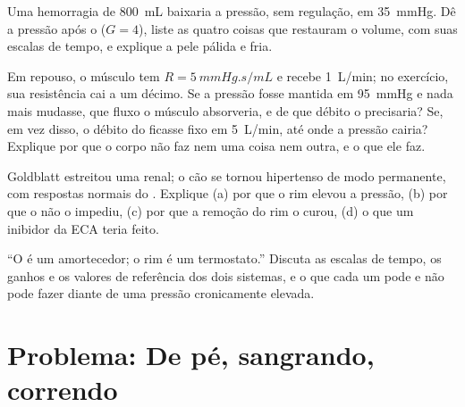 \begin{exercise}[$\star\star$]\label{exo:b2:blood-pressure:9}
Uma hemorragia de \qty{800}{mL} baixaria a pressão, sem regulação, em
\qty{35}{mmHg}. Dê a pressão após o  ($G = 4$), liste as
quatro coisas que restauram o volume, com suas escalas de tempo, e
explique a pele pálida e fria.
\end{exercise}

\begin{exercise}[$\star\star\star$]\label{exo:b2:blood-pressure:10}
Em repouso, o músculo tem $R = \qty{5}{mmHg.s/mL}$ e recebe
\qty{1}{L/min}; no exercício, sua resistência cai a um décimo. Se a
pressão fosse mantida em \qty{95}{mmHg} e nada mais mudasse, que fluxo
o músculo absorveria, e de que débito o  precisaria? Se, em vez
disso, o débito do  ficasse fixo em \qty{5}{L/min}, até onde a
pressão cairia? Explique por que o corpo não faz nem uma coisa nem
outra, e o que ele faz.
\end{exercise}

\begin{exercise}[$\star\star\star$]\label{exo:b2:blood-pressure:11}
Goldblatt estreitou uma  renal; o cão se tornou hipertenso de
modo permanente, com respostas normais do . Explique (a)
por que o rim elevou a pressão, (b) por que o  não o
impediu, (c) por que a remoção do rim o curou, (d) o que um inibidor
da ECA teria feito.
\end{exercise}

\begin{exercise}[$\star\star\star$]\label{exo:b2:blood-pressure:12}
``O  é um amortecedor; o rim é um termostato.'' Discuta as
escalas de tempo, os ganhos e os valores de referência dos dois
sistemas, e o que cada um pode e não pode fazer diante de uma pressão
cronicamente elevada.
\end{exercise}

\section{Problema: De pé, sangrando, correndo}

